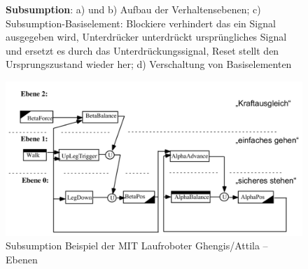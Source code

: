 \begin{figure}
\centering
{}
\par\medskip
{}
	\caption{\textbf{Subsumption}: a) und b) Aufbau der Verhaltensebenen; c) Subsumption-Basiselement: Blockiere verhindert das ein Signal ausgegeben wird, Unterdrücker unterdrückt ursprüngliches Signal und ersetzt es durch das Unterdrückungssignal, Reset stellt den Ursprungszustand wieder her; d) Verschaltung von Basiselementen}
\end{figure}

\begin{figure}
	\includegraphics[width=\textwidth]{figures/subsumption_beispiel.png}
	\caption{Subsumption Beispiel der MIT Laufroboter Ghengis/Attila -- Ebenen}
\end{figure}

